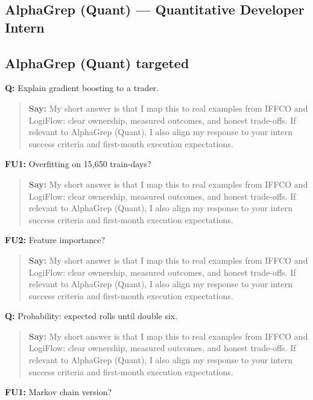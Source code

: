 \documentclass[9pt,a4paper]{article}
\begin{document}
\subsection{AlphaGrep (Quant) --- Quantitative Developer Intern}
\subsection{AlphaGrep (Quant) targeted}
\textbf{Q:} Explain gradient boosting to a trader.

\begin{quote}\small\textbf{Say:} My short answer is that I map this to real examples from IFFCO and LogiFlow: clear ownership, measured outcomes, and honest trade-offs. If relevant to AlphaGrep (Quant), I also align my response to your intern success criteria and first-month execution expectations.\end{quote}
\vspace{2mm}
\textbf{FU1:} Overfitting on 15,650 train-days?

\begin{quote}\small\textbf{Say:} My short answer is that I map this to real examples from IFFCO and LogiFlow: clear ownership, measured outcomes, and honest trade-offs. If relevant to AlphaGrep (Quant), I also align my response to your intern success criteria and first-month execution expectations.\end{quote}
\vspace{2mm}
\textbf{FU2:} Feature importance?

\begin{quote}\small\textbf{Say:} My short answer is that I map this to real examples from IFFCO and LogiFlow: clear ownership, measured outcomes, and honest trade-offs. If relevant to AlphaGrep (Quant), I also align my response to your intern success criteria and first-month execution expectations.\end{quote}
\vspace{2mm}
\textbf{Q:} Probability: expected rolls until double six.

\begin{quote}\small\textbf{Say:} My short answer is that I map this to real examples from IFFCO and LogiFlow: clear ownership, measured outcomes, and honest trade-offs. If relevant to AlphaGrep (Quant), I also align my response to your intern success criteria and first-month execution expectations.\end{quote}
\vspace{2mm}
\textbf{FU1:} Markov chain version?
\end{document}
